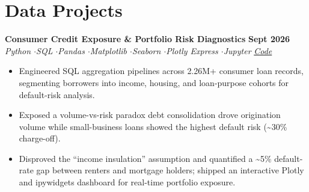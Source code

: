 \documentclass[10pt,a4paper]{article}
\newcommand{\sep}{\;$\cdot$\;}
\newcommand{\entry}[4]{%
  \textbf{#1} \hfill \textbf{\small #4}\\
  \textit{\small #2} \hfill \textit{\small #3}\par\vspace{0.5pt}%
}
\newcommand{\rbullets}[1]{%
  {\small
  \begin{itemize}[leftmargin=1.1em,itemsep=0.5pt,topsep=1.5pt,parsep=0pt,partopsep=0pt,label=\textbullet]
    #1
  \end{itemize}}%
}
\begin{document}
\section{Data Projects}

\entry{Consumer Credit Exposure \& Portfolio Risk Diagnostics}{Python \sep SQL \sep Pandas \sep Matplotlib \sep Seaborn \sep Plotly Express \sep Jupyter}{\href{https://github.com/GauravRoy092/credit_portfolio_exposure}{Code}}{Sept 2026}
\rbullets{
  \item Engineered SQL aggregation pipelines across 2.26M+ consumer loan records, segmenting borrowers into income, housing, and loan-purpose cohorts for default-risk analysis.
  \item Exposed a volume-vs-risk paradox \textemdash{} debt consolidation drove origination volume while small-business loans showed the highest default risk (\textasciitilde30\% charge-off).
  \item Disproved the ``income insulation'' assumption and quantified a \textasciitilde5\% default-rate gap between renters and mortgage holders; shipped an interactive Plotly and ipywidgets dashboard for real-time portfolio exposure.
}


\end{document}
